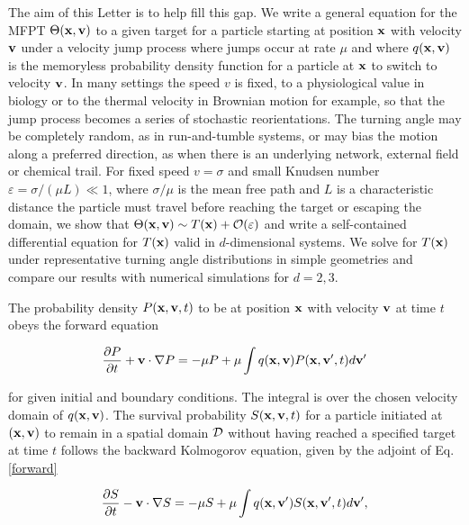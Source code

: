 \documentclass[
 reprint,










 amsmath,amssymb,
 aps, prl,






longbibliography
]{revtex4-2}
\begin{document}
The aim of this Letter is to help fill this gap.
We write a general equation for the MFPT $\Theta({\bf x},{\bf {v}})$
to a given target for a particle starting at position ${\bf {x}}$ with velocity ${\bf {v}}$ under a velocity jump process
where jumps occur at rate $\mu$ and where $q({\bf {x}},{\bf {v}})$ is the memoryless probability
density function for a particle at  ${\bf {x}}$ to switch to velocity ${\bf {v}}$.
In many settings the speed $v$ is fixed,
to a physiological value in biology or to the thermal velocity in Brownian motion for example,
so that the jump process becomes a series
of stochastic reorientations.  The turning angle may be completely random,
as in run-and-tumble systems,
or may bias the motion along a preferred direction, as when there is an underlying
network, external field or chemical trail. For fixed speed
$ v  = \sigma$ and
small Knudsen number $\varepsilon = \sigma / (\mu L)  \ll 1$,
where $\sigma / \mu$ is the mean free path and $L$ is a characteristic distance
the particle must travel before reaching the target or escaping the domain,
we show that $\Theta({{\bf {x}}},{\bf {v}}) \sim T({\bf {x}}) + {\cal O}(\varepsilon)$
and write a self-contained differential equation for $T({\bf {x}})$
valid in $d$-dimensional systems.
We solve for $T({\bf {x}})$ under
representative turning angle distributions in simple geometries
and compare our results with numerical simulations for $d=2, 3$.


The probability density $P ({\bf {x}}, {\bf {v}}, t)$
to be at position ${\bf {x}}$ with velocity ${\bf {v}}$ at time $t$ obeys the forward equation

\begin{equation}
\label{forward}
\frac{\partial P }{\partial t}  + {\bf {v}} \cdot  \nabla P = - \mu P +  \mu \int q({\bf {x}},{\bf {v}}) P({\bf {x}}, {\bf{v}'}, t) d \bf{v}'
\end{equation}

for given initial and boundary conditions.
The integral is over the chosen velocity domain
of $q({\bf {x}}, {\bf {v}})$.
The survival probability
$S({\bf {x}}, {\bf {v}},t)$ for a particle initiated
at $({\bf {x}}, {\bf{v}})$ to remain in a spatial domain
$\cal D$ without having reached a specified target at time $t$ follows the backward
Kolmogorov equation, given
by the adjoint of Eq.\,\ref{forward}

\begin{equation}
\label{backward}
\frac{\partial S }{\partial t}  - {\bf {v}} \cdot  \nabla S = - \mu S +  \mu \int q({\bf {x}},{\bf{v}}') S({\bf {x}}, {\bf{v}'}, t) d \bf{v}',
\end{equation}
\end{document}
